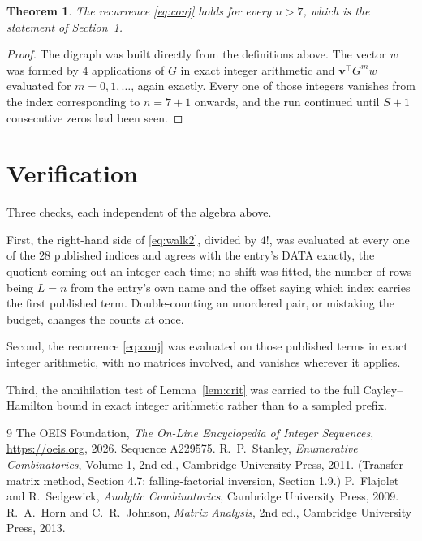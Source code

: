 \documentclass[11pt,a4paper]{article}
\theoremstyle{plain}
\newtheorem{theorem}{Theorem}
\theoremstyle{definition}
\begin{document}
\begin{theorem}
The recurrence \eqref{eq:conj} holds for every $n>7$, which is the statement of
Section~1.
\end{theorem}

\begin{proof}
The digraph was built directly from the definitions above. The vector $w$ was formed by
$4$ applications of $G$ in exact integer arithmetic and $\mathbf{v}^{\!\top}G^{m}w$
evaluated for $m=0,1,\dots$, again exactly. Every one of those integers vanishes from the
index corresponding to $n=7+1$ onwards, and the run continued until $S+1$ consecutive
zeros had been seen.
\end{proof}

\section{Verification}

Three checks, each independent of the algebra above.

First, the right-hand side of \eqref{eq:walk2}, divided by $4!$, was evaluated at every
one of the $28$ published indices and agrees with the entry's DATA exactly, the quotient
coming out an integer each time; no shift was fitted, the number of rows being $L=n$
from the entry's own name and the offset saying which index carries the first published term.
Double-counting an unordered pair, or mistaking the budget, changes the counts at once.

Second, the recurrence \eqref{eq:conj} was evaluated on those published terms in exact
integer arithmetic, with no matrices involved, and vanishes wherever it applies.

Third, the annihilation test of Lemma~\ref{lem:crit} was carried to the full
Cayley--Hamilton bound in exact integer arithmetic rather than to a sampled prefix.

\begin{thebibliography}{9}
 The OEIS Foundation, \emph{The On-Line Encyclopedia of Integer
Sequences}, \url{https://oeis.org}, 2026. Sequence A229575.
 R.~P.~Stanley, \emph{Enumerative Combinatorics}, Volume 1, 2nd ed.,
Cambridge University Press, 2011. (Transfer-matrix method, Section 4.7; falling-factorial
inversion, Section 1.9.)
 P.~Flajolet and R.~Sedgewick, \emph{Analytic Combinatorics}, Cambridge
University Press, 2009.
 R.~A.~Horn and C.~R.~Johnson, \emph{Matrix Analysis}, 2nd ed., Cambridge
University Press, 2013.
\end{thebibliography}
\end{document}
